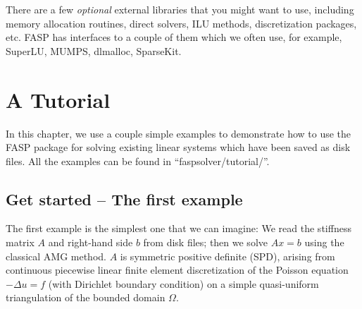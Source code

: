\documentclass[11pt]{memoir}
\begin{document}
There are a few \emph{optional} external libraries that you might want to use, including memory allocation routines, direct solvers, ILU methods, discretization packages, etc. FASP has interfaces to a couple of them which we often use, for example, SuperLU, MUMPS, dlmalloc, SparseKit. 


\chapter{A Tutorial}\label{ch:tutor}

In this chapter, we use a couple simple examples to demonstrate how to use the FASP package for solving existing linear systems which have been saved as disk files. All the examples can be found in ``faspsolver/tutorial/''. 

\section{Get started -- The first example}

The first example is the simplest one that we can imagine: We read the stiffness matrix $A$ and right-hand side $b$ from disk files; then we solve $Ax=b$ using the classical AMG method. $A$ is symmetric positive definite (SPD), arising from continuous piecewise linear finite element discretization of the Poisson equation $-\Delta u = f$ (with Dirichlet boundary condition) on a simple quasi-uniform triangulation of the bounded domain $\Omega$. 
 
\end{document}
